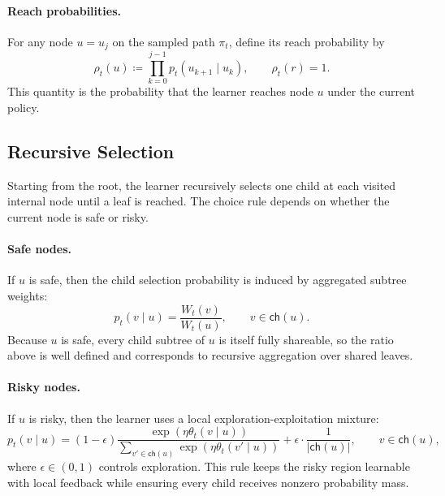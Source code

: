 \documentclass{article}
\begin{document}
\paragraph{Reach probabilities.}
For any node $u=u_j$ on the sampled path $\pi_t$, define its reach probability by
\begin{equation}
    \rho_t(u) \coloneqq \prod_{k=0}^{j-1} p_t(u_{k+1}\mid u_k),
    \qquad \rho_t(r)=1.
    \label{eq:reach_prob}
\end{equation}
This quantity is the probability that the learner reaches node $u$ under the current policy.

\subsection{Recursive Selection}
\label{sec:barriershare_selection}

Starting from the root, the learner recursively selects one child at each visited internal node until a leaf is reached. The choice rule depends on whether the current node is safe or risky.

\paragraph{Safe nodes.}
If $u$ is safe, then the child selection probability is induced by aggregated subtree weights:
\begin{equation}
    p_t(v\mid u) = \frac{W_t(v)}{W_t(u)},
    \qquad v \in \mathsf{ch}(u).
    \label{eq:safe_selection}
\end{equation}
Because $u$ is safe, every child subtree of $u$ is itself fully shareable, so the ratio above is well defined and corresponds to recursive aggregation over shared leaves.

\paragraph{Risky nodes.}
If $u$ is risky, then the learner uses a local exploration-exploitation mixture:
\begin{equation}
    p_t(v\mid u)
    =
    (1-\epsilon)\frac{\exp(\eta \theta_t(v\mid u))}{\sum_{v' \in \mathsf{ch}(u)} \exp(\eta \theta_t(v'\mid u))}
    +
    \epsilon\cdot \frac{1}{|\mathsf{ch}(u)|},
    \qquad v \in \mathsf{ch}(u),
    \label{eq:risky_selection}
\end{equation}
where $\epsilon \in (0,1)$ controls exploration. This rule keeps the risky region learnable with local feedback while ensuring every child receives nonzero probability mass.
\end{document}
